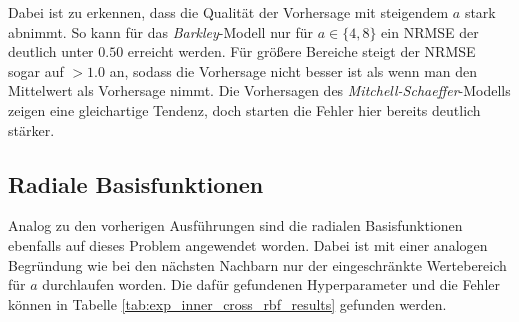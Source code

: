 Dabei ist zu erkennen, dass die Qualität der Vorhersage mit steigendem $a$ stark abnimmt. So kann für das \textit{Barkley}-Modell nur für $a \in \{4,8\}$ ein NRMSE der deutlich unter $0.50$ erreicht werden. Für größere Bereiche steigt der NRMSE sogar auf $> 1.0$ an, sodass die Vorhersage nicht besser ist als wenn man den Mittelwert als Vorhersage nimmt. Die Vorhersagen des \textit{Mitchell-Schaeffer}-Modells zeigen eine gleichartige Tendenz, doch starten die Fehler hier bereits deutlich stärker. 

\FloatBarrier
\subsection{Radiale Basisfunktionen}
Analog zu den vorherigen Ausführungen sind die radialen Basisfunktionen ebenfalls auf dieses Problem angewendet worden. Dabei ist mit einer analogen Begründung wie bei den nächsten Nachbarn nur der eingeschränkte Wertebereich für $a$ durchlaufen worden. Die dafür gefundenen Hyperparameter und die Fehler können in Tabelle \ref{tab:exp_inner_cross_rbf_results} gefunden werden.
